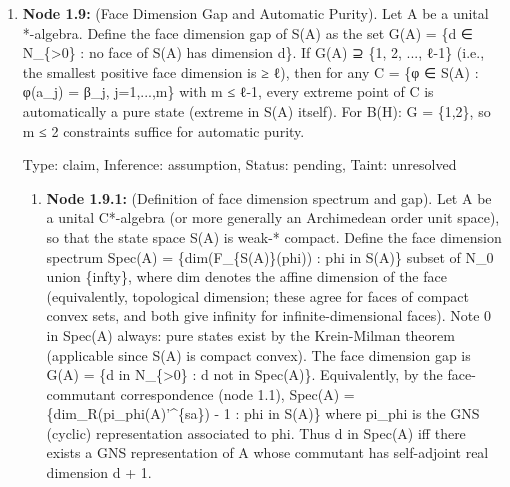 \documentclass{article}
\begin{document}
\begin{enumerate}
\begin{enumerate}
\item \textbf{Node 1.8.5:} (Extension beyond Type I). Our framework applies to states on arbitrary C*-algebras, not just B(H). For non-Type-I algebras (e.g., the hyperfinite II\_1 factor R, group C*-algebras of non-Type-I groups, free group factors L(F\_n)), the face structure of S(A) is much richer: there exist faces of all dimensions, the face dimension gap may differ, and the commutant need not be a direct sum of matrix algebras in general. However, the bound dim\_R(π\_φ(A)'\textasciicircum{}\{sa\}) ≤ m + 1 still forces the commutant to be finite-dimensional under finitely many constraints, and the Artin-Wedderburn decomposition applies to this finite-dimensional commutant regardless of the algebra type.

  Type: claim, Inference: assumption, Status: validated, Taint: unresolved

\end{enumerate}
\item \textbf{Node 1.9:} (Face Dimension Gap and Automatic Purity). Let A be a unital *-algebra. Define the face dimension gap of S(A) as the set G(A) = \{d ∈ N\_\{>0\} : no face of S(A) has dimension d\}. If G(A) ⊇ \{1, 2, ..., ℓ-1\} (i.e., the smallest positive face dimension is ≥ ℓ), then for any C = \{φ ∈ S(A) : φ(a\_j) = β\_j, j=1,...,m\} with m ≤ ℓ-1, every extreme point of C is automatically a pure state (extreme in S(A) itself). For B(H): G = \{1,2\}, so m ≤ 2 constraints suffice for automatic purity.

  Type: claim, Inference: assumption, Status: pending, Taint: unresolved

\begin{enumerate}
\item \textbf{Node 1.9.1:} (Definition of face dimension spectrum and gap). Let A be a unital C*-algebra (or more generally an Archimedean order unit space), so that the state space S(A) is weak-* compact. Define the face dimension spectrum Spec(A) = \{dim(F\_\{S(A)\}(phi)) : phi in S(A)\} subset of N\_0 union \{infty\}, where dim denotes the affine dimension of the face (equivalently, topological dimension; these agree for faces of compact convex sets, and both give infinity for infinite-dimensional faces). Note 0 in Spec(A) always: pure states exist by the Krein-Milman theorem (applicable since S(A) is compact convex). The face dimension gap is G(A) = \{d in N\_\{>0\} : d not in Spec(A)\}. Equivalently, by the face-commutant correspondence (node 1.1), Spec(A) = \{dim\_R(pi\_phi(A)'\textasciicircum{}\{sa\}) - 1 : phi in S(A)\} where pi\_phi is the GNS (cyclic) representation associated to phi. Thus d in Spec(A) iff there exists a GNS representation of A whose commutant has self-adjoint real dimension d + 1.


\end{enumerate}
\end{enumerate}
\end{document}
